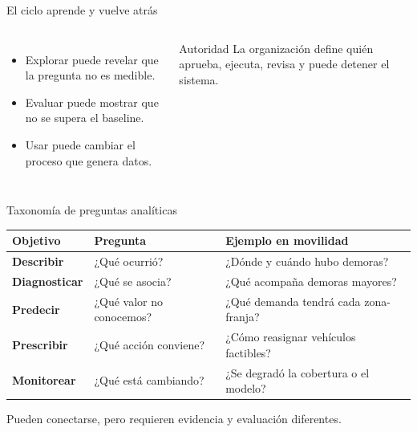 \documentclass[aspectratio=169,11pt]{beamer}
\newcommand{\br}{\\}
\begin{document}
\begin{frame}{El ciclo aprende y vuelve atrás}
  \begin{columns}[c]
      \centering
      \begin{itemize}
        \item Explorar puede revelar que la pregunta no es medible.
        \item Evaluar puede mostrar que no se supera el baseline.
        \item Usar puede cambiar el proceso que genera datos.
      \end{itemize}
      \begin{alertblock}{Autoridad}
        La organización define quién aprueba, ejecuta, revisa y puede detener el sistema.
      \end{alertblock}
  \end{columns}
\end{frame}

\begin{frame}{Taxonomía de preguntas analíticas}
  \small
  \begin{tabularx}{\textwidth}{>{\bfseries}p{} X X}
    \toprule
    Objetivo & Pregunta & Ejemplo en movilidad \\
    \midrule
    Describir & ¿Qué ocurrió? & ¿Dónde y cuándo hubo demoras? \\
    Diagnosticar & ¿Qué se asocia? & ¿Qué acompaña demoras mayores? \\
    Predecir & ¿Qué valor no conocemos? & ¿Qué demanda tendrá cada zona-franja? \\
    Prescribir & ¿Qué acción conviene? & ¿Cómo reasignar vehículos factibles? \\
    Monitorear & ¿Qué está cambiando? & ¿Se degradó la cobertura o el modelo? \\
    \bottomrule
  \end{tabularx}
  \vfill
  \centering\alert{Pueden conectarse, pero requieren evidencia y evaluación diferentes.}
\end{frame}
\end{document}
